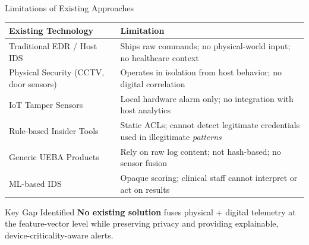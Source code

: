 \documentclass[10pt, aspectratio=169]{beamer}
\begin{document}
\begin{frame}{Limitations of Existing Approaches}
  \begin{table}[h]
    \centering
    \small
    \begin{tabular}{@{}p{3.8cm}p{8.5cm}@{}}
      \toprule
      \textbf{Existing Technology} & \textbf{Limitation} \\
      \midrule
      Traditional EDR / Host IDS &
        Ships raw commands; no physical-world input; no healthcare context \\[4pt]
      Physical Security (CCTV, door sensors) &
        Operates in isolation from host behavior; no digital correlation \\[4pt]
      IoT Tamper Sensors &
        Local hardware alarm only; no integration with host analytics \\[4pt]
      Rule-based Insider Tools &
        Static ACLs; cannot detect legitimate credentials used in illegitimate \textit{patterns} \\[4pt]
      Generic UEBA Products &
        Rely on raw log content; not hash-based; no sensor fusion \\[4pt]
      ML-based IDS &
        Opaque scoring; clinical staff cannot interpret or act on results \\
      \bottomrule
    \end{tabular}
  \end{table}
  \vspace{4pt}
  \begin{block}{Key Gap Identified}
    \textbf{No existing solution} fuses physical + digital telemetry at the feature-vector level
    while preserving privacy and providing explainable, device-criticality-aware alerts.
  \end{block}
\end{frame}
\end{document}
